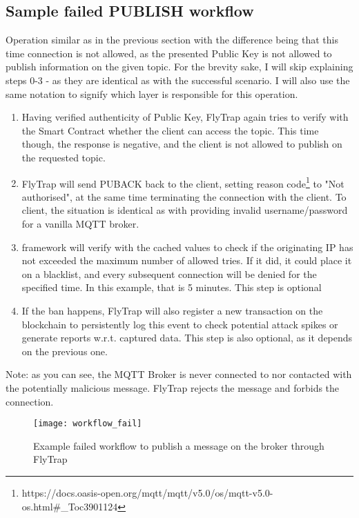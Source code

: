 \subsection{Sample failed PUBLISH workflow}
Operation similar as in the previous section with the difference being that this time connection is not allowed, as the presented Public Key is not allowed to publish information on the given topic. For the brevity sake, I will skip explaining steps 0-3 - as they are identical as with the successful scenario. I will also use the same notation to signify which layer is responsible for this operation.

\begin{enumerate}\addtocounter{enumi}{4}
    \item Having verified authenticity of Public Key, FlyTrap again tries to verify with the Smart Contract whether the client can access the topic. This time though, the response is negative, and the client is not allowed to publish on the requested topic.
    \item FlyTrap will send PUBACK back to the client, setting reason code\footnote{https://docs.oasis-open.org/mqtt/mqtt/v5.0/os/mqtt-v5.0-os.html\#\_Toc3901124} to "Not authorised", at the same time terminating the connection with the client. To client, the situation is identical as with providing invalid username/password for a vanilla MQTT broker.
    \item framework will verify with the cached values to check if the originating IP has not exceeded the maximum number of allowed tries. If it did, it could place it on a blacklist, and every subsequent connection will be denied for the specified time. In this example, that is 5 minutes. This step is optional
    \item If the ban happens, FlyTrap will also register a new transaction on the blockchain to persistently log this event to check potential attack spikes or generate reports w.r.t.  captured data. This step is also optional, as it depends on the previous one.
\end{enumerate}

Note: as you can see, the MQTT Broker is never connected to nor contacted with the potentially malicious message. FlyTrap rejects the message and forbids the connection. 
\begin{figure}[h]
    \centering
    \texttt{[image: workflow\_fail]}
    \caption{Example failed workflow to publish a message on the broker through FlyTrap}
    \label{fig:workflow_fail}
\end{figure}

